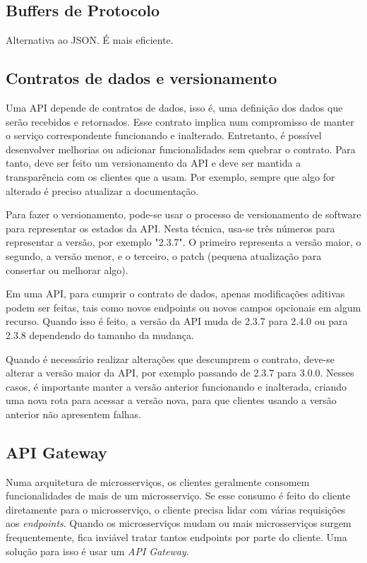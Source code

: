 \subsection{Buffers de Protocolo}
Alternativa ao JSON. É mais eficiente.

\subsection{Contratos de dados e versionamento}
Uma API depende de contratos de dados, isso é, uma definição dos dados que serão recebidos e retornados. Esse contrato implica num compromisso de manter o serviço correspondente funcionando e inalterado. Entretanto, é possível desenvolver melhorias ou adicionar funcionalidades sem quebrar o contrato. Para tanto, deve ser feito um versionamento da API e deve ser mantida a transparência com os clientes que a usam. Por exemplo, sempre que algo for alterado é preciso atualizar a documentação.

Para fazer o versionamento, pode-se usar o processo de versionamento de software para representar os estados da API. Nesta técnica, usa-se três números para representar a versão, por exemplo "2.3.7". O primeiro representa a versão maior, o segundo, a versão menor, e o terceiro, o patch (pequena atualização para consertar ou melhorar algo). \cite{wiki_software_versioning_2022}

Em uma API, para cumprir o contrato de dados, apenas modificações aditivas podem ser feitas, tais como novos endpoints ou novos campos opcionais em algum recurso. Quando isso é feito, a versão da API muda de 2.3.7 para 2.4.0 ou para 2.3.8 dependendo do tamanho da mudança.

Quando é necessário realizar alterações que descumprem o contrato, deve-se alterar a versão maior da API, por exemplo passando de 2.3.7 para 3.0.0. Nesses casos, é importante manter a versão anterior funcionando e inalterada, criando uma nova rota para acessar a versão nova, para que clientes usando a versão anterior não apresentem falhas.

\subsection{API Gateway}\label{boas-praticas-api-gateway}
Numa arquitetura de microsserviços, os clientes geralmente consomem funcionalidades de mais de um microsserviço. Se esse consumo é feito do cliente diretamente para o microsserviço, o cliente precisa lidar com várias requisições aos \emph{endpoints}. Quando os microsserviços mudam ou mais microsserviços surgem frequentemente, fica inviável tratar tantos endpoints por parte do cliente. Uma solução para isso é usar um \emph{API Gateway}. 

